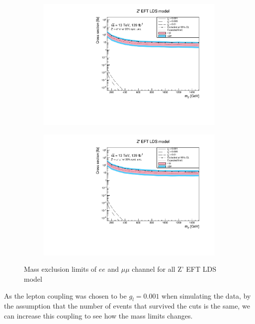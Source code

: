 \documentclass[12pt, a4paper]{book}
\begin{document}
\begin{figure}[!ht]
	\centering
   \begin{subfigure}[b]{0.49\textwidth}
      \centering
      \includegraphics[width=1\textwidth]{Limits/EFT_LDS/mass_exclusion_ee.pdf}
      \end{subfigure}
   \hfill
   \begin{subfigure}[b]{0.49\textwidth}
      \centering
      \includegraphics[width=1\textwidth]{Limits/EFT_LDS/mass_exclusion_uu.pdf}
      \end{subfigure}
   \caption{Mass exclusion limits of $ee$ and $\mu\mu$ channel for all Z' EFT LDS model}\label{fig:EFT_LDS_exclusion_ee_uu}
\end{figure}
As the lepton coupling was chosen to be $g_l=0.001$ when simulating the data, by the assumption that the number of events that survived the cuts is the same, we can increase this coupling to see how the mass limits changes.
\end{document}
